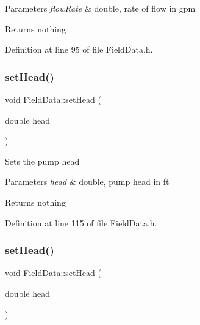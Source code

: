 \begin{DoxyParams}{Parameters}
{\em flow\+Rate} & double, rate of flow in gpm\\
\hline
\end{DoxyParams}
\begin{DoxyReturn}{Returns}
nothing 
\end{DoxyReturn}


Definition at line 95 of file Field\+Data.\+h.

\mbox{\label{class_field_data_ac72a4f958930000bab0e2b772ee26711}} 
\subsubsection{\texorpdfstring{set\+Head()}{setHead()}\hspace{0.1cm}{\footnotesize\ttfamily [1/3]}}
{\footnotesize\ttfamily void Field\+Data\+::set\+Head (\begin{DoxyParamCaption}\item[{double}]{head }\end{DoxyParamCaption})\hspace{0.3cm}{\ttfamily [inline]}}

Sets the pump head


\begin{DoxyParams}{Parameters}
{\em head} & double, pump head in ft\\
\hline
\end{DoxyParams}
\begin{DoxyReturn}{Returns}
nothing 
\end{DoxyReturn}


Definition at line 115 of file Field\+Data.\+h.

\mbox{\label{class_field_data_ac72a4f958930000bab0e2b772ee26711}} 
\subsubsection{\texorpdfstring{set\+Head()}{setHead()}\hspace{0.1cm}{\footnotesize\ttfamily [2/3]}}
{\footnotesize\ttfamily void Field\+Data\+::set\+Head (\begin{DoxyParamCaption}\item[{double}]{head }\end{DoxyParamCaption})\hspace{0.3cm}{\ttfamily [inline]}}


